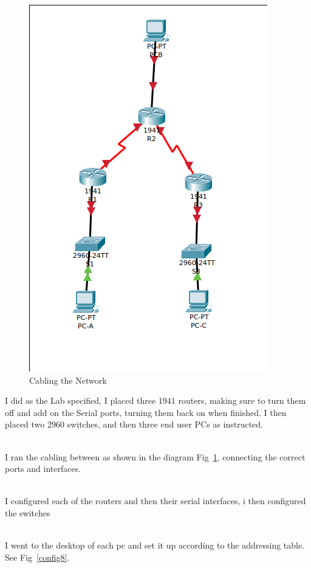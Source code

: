 \documentclass[../EngineeringJournal_CDavis.tex]{subfiles}
\begin{document}
\newpage


\begin{figure}
\centering
    \includegraphics[width=.48\textwidth]{Figures/2020-01-31-112732_392x603_scrot.png}
  \caption{Cabling the Network}\label{cable8}
\end{figure}

\hfill\break 

\hfill\break 

I did as the Lab specified, I placed three 1941 routers, making sure to turn them off and add on the Serial ports, turning them back on when finished. I then placed two 2960 switches, and then three end user PCs as instructed.
\hfill\break 

\noindent{}\\
I ran the cabling between as shown in the diagram Fig~\ref{cable8}, connecting the correct ports and interfaces.
\hfill\break

\noindent{}\\
I configured each of the routers and then their serial interfaces, i then configured the switches
\hfill\break

\noindent{}\\
I went to the desktop of each pc and set it up according to the addressing table. See
Fig~\ref{config8}.
\hfill\break
\end{document}
